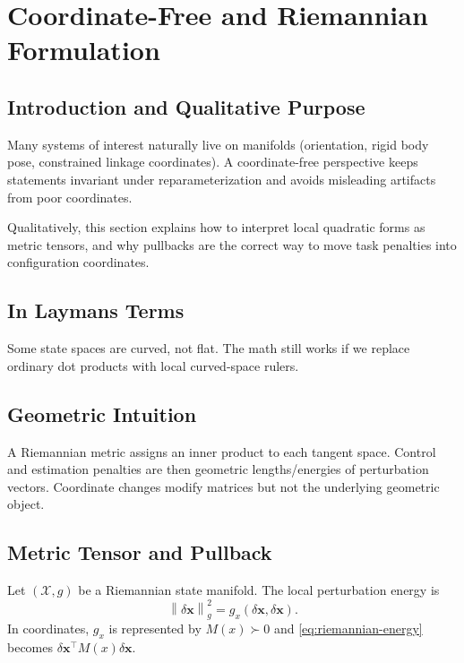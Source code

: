 \documentclass[11pt,letterpaper]{article}
\newcommand{\norm}[1]{\left\lVert #1 \right\rVert}
\newcommand{\dx}{\delta\mathbf{x}}
\begin{document}
\section{Coordinate-Free and Riemannian Formulation}

\subsection{Introduction and Qualitative Purpose}
Many systems of interest naturally live on manifolds (orientation, rigid body pose, constrained linkage coordinates). A coordinate-free perspective keeps statements invariant under reparameterization and avoids misleading artifacts from poor coordinates.

Qualitatively, this section explains how to interpret local quadratic forms as metric tensors, and why pullbacks are the correct way to move task penalties into configuration coordinates.

\subsection{In Laymans Terms}
Some state spaces are curved, not flat. The math still works if we replace ordinary dot products with local curved-space rulers.

\subsection{Geometric Intuition}
A Riemannian metric assigns an inner product to each tangent space. Control and estimation penalties are then geometric lengths/energies of perturbation vectors. Coordinate changes modify matrices but not the underlying geometric object.

\subsection{Metric Tensor and Pullback}
Let $(\mathcal{X},g)$ be a Riemannian state manifold. The local perturbation energy is
\begin{equation}
\norm{\dx}_{g}^2 = g_x(\dx,\dx).
\label{eq:riemannian-energy}
\end{equation}
In coordinates, $g_x$ is represented by $M(x)\succ0$ and \eqref{eq:riemannian-energy} becomes $\dx^\top M(x)\dx$.
\end{document}
